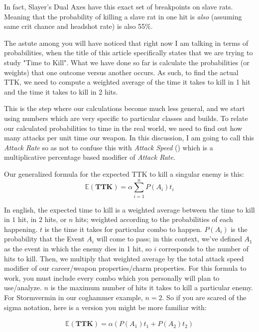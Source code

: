 \documentclass{article}
\begin{document}
In fact, Slayer's Dual Axes have this exact set of breakpoints on slave rats. Meaning that the probability of killing a slave rat in one hit is \emph{also} (assuming same crit chance and headshot rate) is also 55\%.

The astute among you will have noticed that right now I am talking in terms of probabilities, when the title of this article specifically states that we are trying to study "Time to Kill". What we have done so far is calculate the probabilities (or weights) that one outcome versus another occurs. As such, to find the actual TTK, we need to compute a weighted average of the time it takes to kill in 1 hit and the time it takes to kill in 2 hits.

This is the step where our calculations become much less general, and we start using numbers which are very specific to particular classes and builds. To relate our calculated probabilities to time in the real world, we need to find out how many attacks per unit time our weapon. In this discussion, I am going to call this \emph{Attack Rate} so as not to confuse this with \emph{Attack Speed} () which is a multiplicative percentage based modifier of \emph{Attack Rate}.

Our generalized formula for the expected TTK to kill a singular enemy is this:
\begin{equation}
\mathbb{E}(\mathbf{TTK}) = \alpha \sum_{i=1}^{n} P(A_i) t_i
\end{equation}

In english, the expected time to kill is a weighted average between the time to kill in $1$ hit, in $2$ hits, or $n$ hits; weighted according to the probabilities of each happening. $t$ is the time it takes for particular combo to happen. $P(A_i)$ is the probability that the Event $A_i$ will come to pass; in this context, we've defined $A_1$ as the event in which the enemy dies in 1 hit, so $i$ corresponds to the number of hits to kill. Then, we multiply that weighted average by the total attack speed modifier of our career/weapon properties/charm properties. For this formula to work, you must include every combo which you personally will plan to use/analyze. $n$ is the maximum number of hits it takes to kill a particular enemy. For Stormvermin in our coghammer example, $n=2$. So if you are scared of the sigma notation, here is a version you might be more familiar with:

\begin{align*}
\mathbb{E}(\mathbf{TTK}) = \alpha (P(A_1) t_1 + P(A_2) t_2)
\end{align*}
\end{document}
